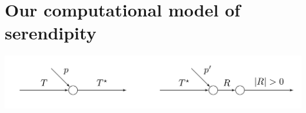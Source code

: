 \section{Our computational model of serendipity} \label{sec:background}



% 
{\centering
\includegraphics[width=.8\textwidth]{schematic}
\par}

